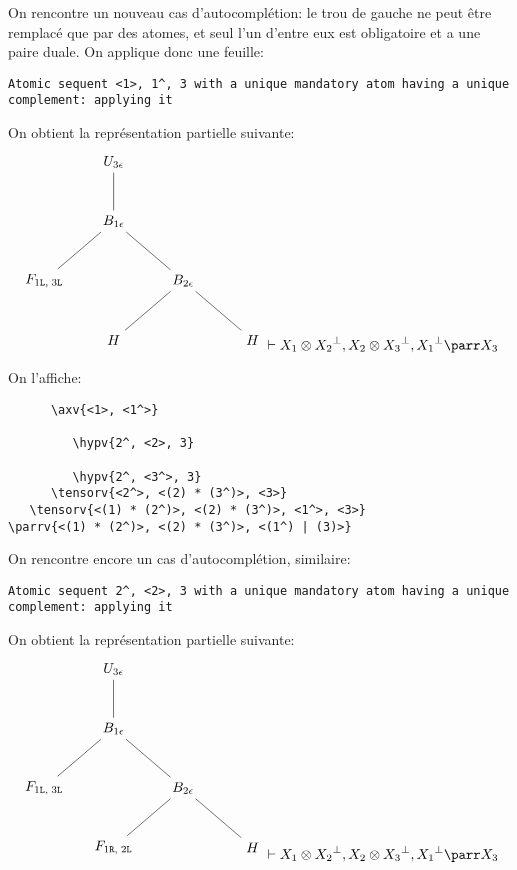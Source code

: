 \documentclass[11pt,a4paper]{article}
\theoremstyle{plain}
\theoremstyle{definition}
\theoremstyle{remark}
\newcommand*{\orth}{^\perp}
\newcommand*{\tensor}{\otimes}
\newcommand*{\hypv}[1]{\hypo{\vdash #1}}
\newcommand*{\axv}[1]{\infer{0}[\ensuremath{\mathit{ax}}]{\vdash #1}}
\newcommand*{\tensorv}[1]{\infer{2}[\ensuremath{\tensor}]{\vdash #1}}
\newcommand*{\parrv}[1]{\infer{1}[\ensuremath{\parr}]{\vdash #1}}
\newcommand*{\Left}{\textnormal{\texttt{L}}}
\newcommand*{\Right}{\textnormal{\texttt{R}}}
\newcommand*{\unknown}{H}
\begin{document}
On rencontre un nouveau cas d'autocomplétion: le trou de gauche ne peut être remplacé que par des atomes, et seul l'un d'entre eux est obligatoire et a une paire duale. On applique donc une feuille:

\begin{verbatim}
Atomic sequent <1>, 1^, 3 with a unique mandatory atom having a unique
complement: applying it
\end{verbatim}

On obtient la représentation partielle suivante:
\begin{equation*}
    \begin{tikzpicture}%
        [level 2/.style={sibling distance=3.5cm}]
        \node {$U_{3 \epsilon}$}
        child {node {$B_{1 \epsilon}$}
            child {node {$F_{1 \Left, \; 3 \Left}$}}
            child {node {$B_{2 \epsilon}$}
                child{node {$\unknown$}}
                child{node {$\unknown$}}}
        };
    \end{tikzpicture} \vdash X_1 \tensor {X_2}\orth, X_2 \tensor {X_3}\orth, {X_1}\orth \parr X_3
\end{equation*}

On l'affiche:

\begin{verbatim}
      \axv{<1>, <1^>}

         \hypv{2^, <2>, 3}

         \hypv{2^, <3^>, 3}
      \tensorv{<2^>, <(2) * (3^)>, <3>}
   \tensorv{<(1) * (2^)>, <(2) * (3^)>, <1^>, <3>}
\parrv{<(1) * (2^)>, <(2) * (3^)>, <(1^) | (3)>}
\end{verbatim}

On rencontre encore un cas d'autocomplétion, similaire:
\begin{verbatim}
Atomic sequent 2^, <2>, 3 with a unique mandatory atom having a unique
complement: applying it
\end{verbatim}

On obtient la représentation partielle suivante:
\begin{equation*}
    \begin{tikzpicture}%
        [level 2/.style={sibling distance=3.5cm}]
        \node {$U_{3 \epsilon}$}
        child {node {$B_{1 \epsilon}$}
            child {node {$F_{1 \Left, \; 3 \Left}$}}
            child {node {$B_{2 \epsilon}$}
                child{node {$F_{1 \Right, \; 2 \Left}$}}
                child{node {$\unknown$}}}
        };
    \end{tikzpicture} \vdash X_1 \tensor {X_2}\orth, X_2 \tensor {X_3}\orth, {X_1}\orth \parr X_3
\end{equation*}
\end{document}
